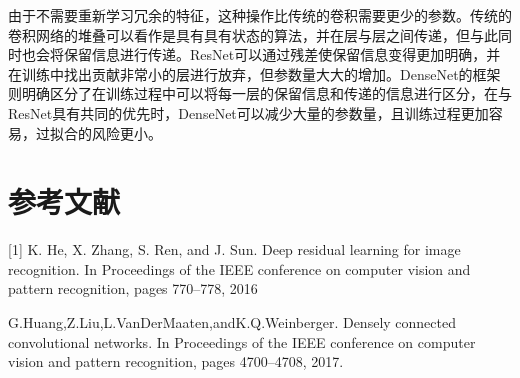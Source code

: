\documentclass{article}
\begin{document}
由于不需要重新学习冗余的特征，这种操作比传统的卷积需要更少的参数。传统的卷积网络的堆叠可以看作是具有具有状态的算法，并在层与层之间传递，但与此同时也会将保留信息进行传递。ResNet可以通过残差使保留信息变得更加明确，并在训练中找出贡献非常小的层进行放弃，但参数量大大的增加。DenseNet的框架则明确区分了在训练过程中可以将每一层的保留信息和传递的信息进行区分，在与ResNet具有共同的优先时，DenseNet可以减少大量的参数量，且训练过程更加容易，过拟合的风险更小。



\section*{参考文献}
[1] K. He, X. Zhang, S. Ren, and J. Sun. Deep residual learning for image recognition. In Proceedings of the IEEE conference on computer vision and pattern recognition, pages 770–778, 2016

\noindent [2] G.Huang,Z.Liu,L.VanDerMaaten,andK.Q.Weinberger. Densely connected convolutional networks. In Proceedings of the IEEE conference on computer vision and pattern recognition, pages 4700–4708, 2017.
\end{document}
